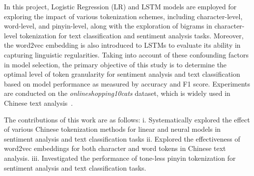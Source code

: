 In this project, Logistic Regression (LR) and LSTM models are employed for exploring the impact of various tokenization schemes, including character-level, word-level, and pinyin-level, along with the exploration of bigrams in character-level tokenization for text classification and sentiment analysis tasks. Moreover, the word2vec embedding is also introduced to LSTMs to evaluate its ability in capturing linguistic regularities. Taking into account of these confounding factors in model selection, the primary objective of this study is to determine the optimal level of token granularity for sentiment analysis and text classification based on model performance as measured by accuracy and F1 score. Experiments are conducted on the \textit{onlineshopping10cats} dataset, which is widely used in Chinese text analysis~\citep{sun2022word, graves2005}.

The contributions of this work are as follows: i. Systematically explored the effect of various Chinese tokenization methods for linear and neural models in sentiment analysis and text classification tasks ii. Explored the effectiveness of word2vec embeddings for both character and word tokens in Chinese text analysis. iii. Investigated the performance of tone-less pinyin tokenization for sentiment analysis and text classification tasks.
